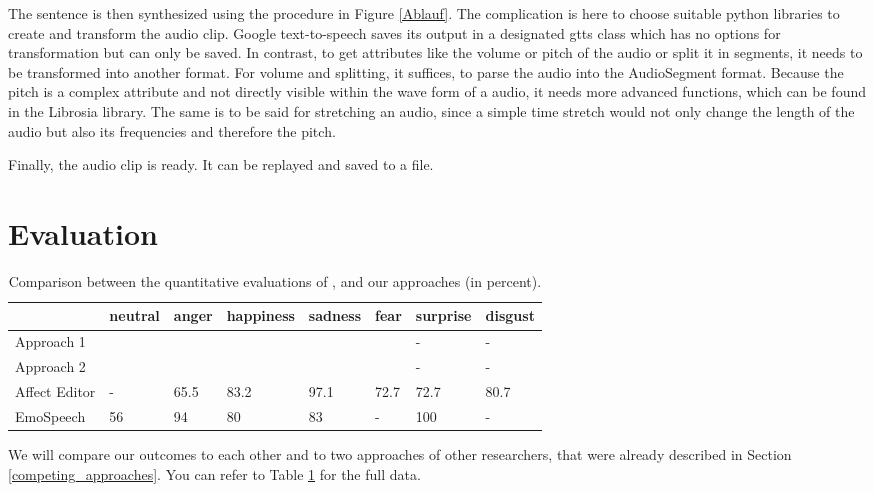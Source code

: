 \documentclass[11pt]{article}
\begin{document}
The sentence is then synthesized using the procedure in Figure \ref{Ablauf}. The complication is here to choose suitable python libraries to create and transform the audio clip. Google text-to-speech saves its output in a designated gtts class which has no options for transformation but can only be saved. In contrast, to get attributes like the volume or pitch of the audio or split it in segments, it needs to be transformed into another format. For volume and splitting, it suffices, to parse the audio into the AudioSegment format. Because the pitch is a complex attribute and not directly visible within the wave form of a audio, it needs more advanced functions, which can be found in the Librosia library. The same is to be said for stretching an audio, since a simple time stretch would not only change the length of the audio but also its frequencies and therefore the pitch.

Finally, the audio clip is ready. It can be replayed and saved to a file.

\section{Evaluation}
\label{evaluation}
\begin{table}[t]

\centering
\vspace{5px}
{
\begin{tabular}{|p{2cm}|p{1.5cm}|p{1.5cm}|p{1.5cm}|p{1.5cm}|p{1.5cm}|p{1.5cm}|p{1.5cm}|}
\hline
\rowcolor{mintgreen}&neutral&anger&happiness&sadness&fear&surprise&disgust\\
\hline
\cellcolor{gainsboro}Approach 1&&&&&&-&-\\
\hline
\cellcolor{gainsboro}Approach 2&&&&&&-&-\\
\hline
\hline
\cellcolor{gainsboro}Affect Editor& -&65.5&83.2&97.1&72.7&72.7&80.7\\
\hline
\cellcolor{gainsboro}EmoSpeech&56 &94&80 &83&-&100&-\\
\hline
\end{tabular}
}

\caption{Comparison between the quantitative evaluations of \cite{cahn_generation_2000}, \cite{diatlova_emospeech_2023} and our approaches (in percent).}
\label{Tabelle}
\end{table}
We will compare our outcomes to each other and to two approaches of other researchers, that were already described in Section \ref{competing_approaches}. You can refer to Table \ref{Tabelle} for the full data.
\end{document}
